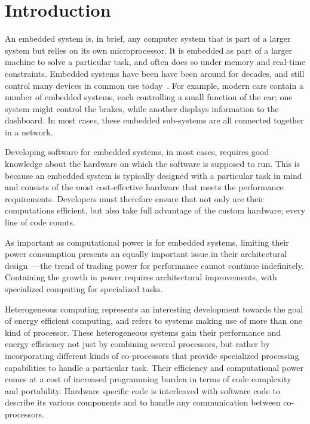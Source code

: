\documentclass[../paper.tex]{subfiles}
\begin{document}
\chapter{Introduction}
\label{intro}

An embedded system is, in brief, any computer system that is part of a larger system but relies on its own microprocessor. It is embedded as part of a larger machine to solve a particular task, and often does so under memory and real-time constraints. Embedded systems have been have been around for decades, and still control many devices in common use today~\cite{barr2006}. For example, modern cars contain a number of embedded systems, each controlling a small function of the car; one system might control the brakes, while another displays information to the dashboard. In most cases, these embedded sub-systems are all connected together in a network. 

Developing software for embedded systems, in most cases, requires good knowledge about the hardware on which the software is supposed to run. This is because an embedded system is typically designed with a particular task in mind and consists of the most cost-effective hardware that meets the performance requirements. Developers must therefore ensure that not only are their computations efficient, but also take full advantage of the custom hardware; every line of code counts.

As important as computational power is for embedded systems, limiting their power consumption presents an equally important issue in their architectural design~\cite{mudge2001}---the trend of trading power for performance cannot continue indefinitely. Containing the growth in power requires architectural improvements, with specialized computing for specialized tasks.

Heterogeneous computing represents an interesting development towards the goal of energy efficient computing, and refers to systems making use of more than one kind of processor. These heterogeneous systems gain their performance and energy efficiency not just by combining several processors, but rather by incorporating different kinds of co-processors that provide specialized processing capabilities to handle a particular task. Their efficiency and computational power comes at a cost of increased programming burden in terms of code complexity and portability. Hardware specific code is interleaved with software code to describe its various components and to handle any communication between co-processors.
\end{document}
